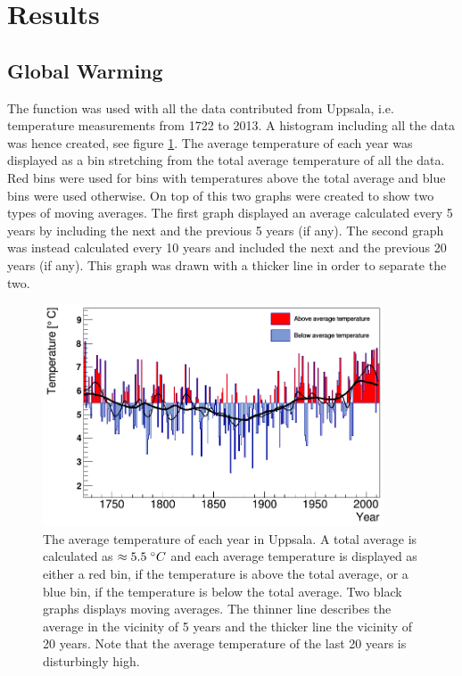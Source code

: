 \section{Results}

\subsection{Global Warming}

The function was used with all the data contributed from Uppsala, i.e. temperature measurements from 1722 to 2013. A histogram including all the data was hence created,  see figure \ref{global_warming_figure}. The average temperature of each year was displayed as a bin stretching from the total average temperature of all the data. Red bins were used for bins with temperatures above the total average and blue bins were used otherwise. On top of this two graphs were created to show two types of moving averages. The first graph displayed an average calculated every 5 years by including the next and the previous 5 years (if any). The second graph was instead calculated every 10 years and included the next and the previous 20 years (if any). This graph was drawn with a thicker line in order to separate the two.

\begin{figure}[H]
\centering
\includegraphics[width=0.9\textwidth]{global_warming.png}
\caption{\label{global_warming_figure} The average temperature of each year in Uppsala. A total average is calculated as $\approx 5.5 \hspace{1mm} ^\circ C$ and each average temperature is displayed as either a red bin, if the temperature is above the total average, or a blue bin, if the temperature is below the total average. Two black graphs displays moving averages. The thinner line describes the average in the vicinity of 5 years and the thicker line the vicinity of 20 years. Note that the average temperature of the last 20 years is disturbingly high. }
\end{figure}

